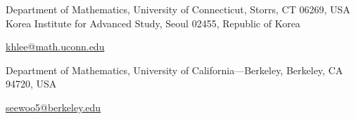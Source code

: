 \documentclass[letterpaper, 10pt]{article}
\newcommand{\1}{\mathds{1}}	%
\theoremstyle{definition}
\theoremstyle{remark}
\begin{document}

\newpage




\medskip

{Department of Mathematics, University of Connecticut, Storrs, CT 06269, USA  \hfill \break \indent Korea Institute for Advanced Study, Seoul 02455, Republic of Korea}

\href{mailto:khlee@math.uconn.edu}{khlee@math.uconn.edu}

\medskip

{Department of Mathematics, University of California---Berkeley, Berkeley, CA 94720, USA}

\href{mailto:seewoo5@berkeley.edu}{seewoo5@berkeley.edu}
\end{document}
